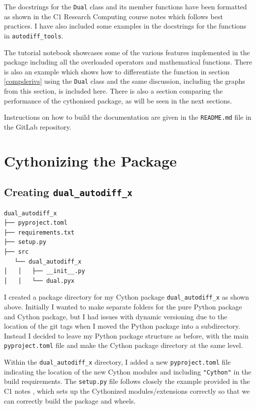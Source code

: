 \documentclass{article}
\begin{document}
The docstrings for the \texttt{Dual} class and its member functions have been formatted as shown in the C1 Research Computing course notes \cite{research_computing_docs} which follows best practices. I have also included some examples in the docstrings for the functions in \texttt{autodiff\_tools}. 

The tutorial notebook showcases some of the various features implemented in the package including all the overloaded operators and mathematical functions. There is also an example which shows how to differentiate the function in section \ref{compderivs} using the \texttt{Dual} class and the same discussion, including the graphs from this section, is included here. There is also a section comparing the performance of the cythonised package, as will be seen in 
the next sections.

Instructions on how to build the documentation are given in the \texttt{README.md} file in the GitLab repository. 

\section{Cythonizing the Package}

\subsection{Creating \texttt{dual\_autodiff\_x}}
\begin{lstlisting}
dual_autodiff_x
├── pyproject.toml
├── requirements.txt
├── setup.py
├── src
   └── dual_autodiff_x
│   │   ├── __init__.py
│   │   └── dual.pyx

\end{lstlisting}

I created a package directory for my Cython package \texttt{dual\_autodiff\_x} as shown above. Initially I wanted to make separate folders for the pure Python package and Cython package, but I had issues with dynamic versioning due to the location of the git tags when I moved the Python package into a subdirectory. Instead I decided to leave my Python package structure as before, with the main \texttt{pyproject.toml} file and make the Cython package directory at the same level. 

Within the \texttt{dual\_autodiff\_x} directory, I added a new \texttt{pyproject.toml} file indicating the location of the new Cython modules and including \texttt{"Cython"} in the build requirements. The \texttt{setup.py} file follows closely the example provided in the C1 notes \cite{research_computing_docs}, which sets up the Cythonized modules/extensions correctly so that we can correctly build the package and wheels.
\end{document}
